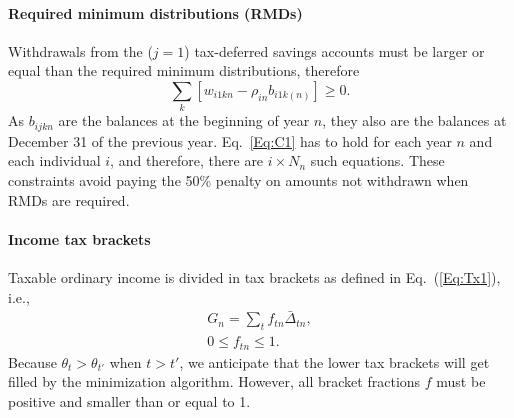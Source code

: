 \documentclass{article}[fleqn,12pt]
\begin{document}
\paragraph*{Required minimum distributions (RMDs)}
	Withdrawals from the ($j=1$) tax-deferred savings accounts must be larger
	or equal than the required minimum distributions, therefore
	\begin{equation}
		\label{Eq:C1}
		\sum_k [w_{i1kn} -  \rho_{in}b_{i1k(n)}] \geq 0.
	\end{equation}
	As $b_{ijkn}$ are the balances at the beginning of year $n$, they also are the balances
	at December 31 of the previous year.
	Eq.~\ref{Eq:C1} has to hold for each year $n$ and each individual $i$, and therefore, there
	are $i\times N_n$ such equations. These constraints avoid paying the 50\% penalty
	on amounts not withdrawn when RMDs are required.

\paragraph*{Income tax brackets}
		\label{Eq:C2}
	Taxable ordinary income is divided in tax brackets as defined in Eq.~(\ref{Eq:Tx1}), i.e.,
	\begin{eqnarray}
		G_n = \sum_t f_{t n}\bar{\Delta}_{t n} ,\nonumber\\
		0 \leq f_{t n} \leq 1.
	\end{eqnarray}
	Because $\theta_{t} > \theta_{t'}$ when $t > t'$, we anticipate that the lower
	tax brackets will get filled by the minimization algorithm.
	However, all bracket fractions $f$ must be positive and smaller than or equal to 1.
\end{document}
